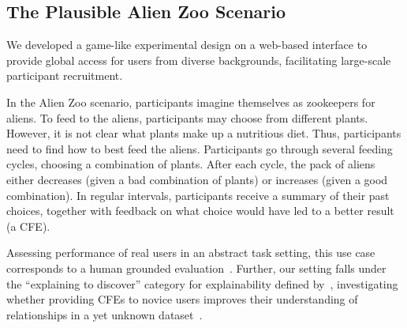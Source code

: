 \subsection{The Plausible Alien Zoo Scenario}

We developed a game-like experimental design on a web-based interface to provide global access for users from diverse backgrounds, facilitating large-scale participant recruitment.

In the Alien Zoo scenario, participants imagine themselves as zookeepers for aliens. 
To feed to the aliens, participants may choose from different plants. 
However, it is not clear what plants make up a nutritious diet. 
Thus, participants need to find how to best feed the aliens. 
Participants go through several feeding cycles, choosing a combination of plants. 
After each cycle, the pack of aliens either decreases (given a bad combination of plants) or increases (given a good combination). 
In regular intervals, participants receive a summary of their past choices, together with feedback on what choice would have led to a better result (\ie a \gls{CFE}).


Assessing performance of real users in an abstract task setting, this use case corresponds to a human grounded evaluation~\citep{doshi-velez_towards_2017}.
Further, our setting falls under the ``explaining to discover'' category for explainability defined by~\citeauthor{adadi_peeking_2018}, investigating whether providing \glspl{CFE} to novice users improves their understanding of relationships in a yet unknown dataset~\citep{adadi_peeking_2018}.



